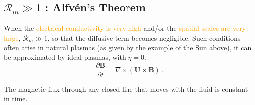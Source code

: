 \documentclass[12pt,a4paper]{article}
\renewcommand{\vec}[1]{\boldsymbol{#1}}
\newcounter{theo}[section]\setcounter{theo}{0}
\renewcommand{\thetheo}{\arabic{section}.\arabic{theo}}
\newenvironment{theo}[2][]{%
\refstepcounter{theo}%
\ifstrempty{#1}%
{\mdfsetup{%
frametitle={%
\tikz[baseline=(current bounding box.east),outer sep=0pt]
\node[anchor=east,rectangle,fill=blue!20]
{\strut Theorem~\thetheo};}}
}%
{\mdfsetup{%
frametitle={%
\tikz[baseline=(current bounding box.east),outer sep=0pt]
\node[anchor=east,rectangle,fill=blue!20]
{\strut Theorem~\thetheo:~#1};}}%
}%
\mdfsetup{innertopmargin=10pt,linecolor=blue!20,%
linewidth=2pt,topline=true,%
frametitleaboveskip=\dimexpr-\ht\strutbox\relax
}
\begin{mdframed}[]\relax%
\label{#2}}{\end{mdframed}}
\begin{document}
\subsection{$\mathcal{R}_m \gg 1$ : Alfv\'en's Theorem}
When the \textcolor{orange}{electrical conductivity is very high} and/or the \textcolor{orange}{spatial scales are very large}, $\mathcal R_m \gg 1$, so that the diffusive term becomes negligible. Such conditions often arise in natural plasmas (as given by the example of the Sun above), it can be approximated by ideal plasmas, with $\eta = 0$.
\begin{equation}
\frac{\partial \vec{B} }{\partial t} = \nabla \times (\vec{U} \times \vec{B} ) ~.
\label{convec}
\end{equation}
\begin{tcolorbox}[colback=green!5,colframe=green!40!black,title=Alfv\'en's theorem]
The magnetic flux through any closed line that moves with the fluid is constant in time.
\end{tcolorbox}
\end{document}
